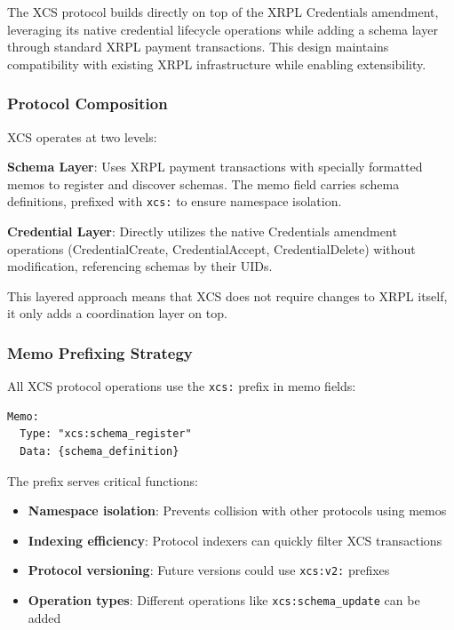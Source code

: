\documentclass[11pt,a4paper]{article}
\begin{document}
The XCS protocol builds directly on top of the XRPL Credentials amendment, leveraging its native credential lifecycle operations while adding a schema layer through standard XRPL payment transactions. This design maintains compatibility with existing XRPL infrastructure while enabling extensibility.

\subsubsection{Protocol Composition}

XCS operates at two levels:

\textbf{Schema Layer}: Uses XRPL payment transactions with specially formatted memos to register and discover schemas. The memo field carries schema definitions, prefixed with \texttt{xcs:} to ensure namespace isolation.

\textbf{Credential Layer}: Directly utilizes the native Credentials amendment operations (CredentialCreate, CredentialAccept, CredentialDelete) without modification, referencing schemas by their UIDs.

\vspace{1em}
This layered approach means that XCS does not require changes to XRPL itself, it only adds a coordination layer on top.

\subsubsection{Memo Prefixing Strategy}

All XCS protocol operations use the \texttt{xcs:} prefix in memo fields:

\begin{lstlisting}[caption={XCS Memo Format}]
Memo:
  Type: "xcs:schema_register"
  Data: {schema_definition}
\end{lstlisting}

The prefix serves critical functions:
\begin{itemize}
    \item \textbf{Namespace isolation}: Prevents collision with other protocols using memos
    \item \textbf{Indexing efficiency}: Protocol indexers can quickly filter XCS transactions
    \item \textbf{Protocol versioning}: Future versions could use \texttt{xcs:v2:} prefixes
    \item \textbf{Operation types}: Different operations like \texttt{xcs:schema\_update} can be added
\end{itemize}
\end{document}
